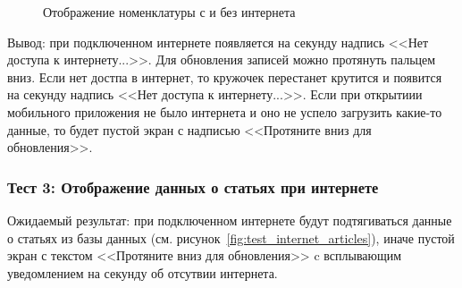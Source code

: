 \begin{figure}[!htb]
    \caption{Отображение номенклатуры с и без интернета}
    \label{fig:test_internet_items}
\end{figure}

Вывод: при подключенном интернете появляется на секунду надпись <<Нет доступа к интернету...>>.
Для обновления записей можно протянуть пальцем вниз. Если нет достпа в интернет,
то кружочек перестанет крутится и появится на секунду надпись <<Нет доступа к интернету...>>.
Если при открытиии мобильного приложения не было интернета и оно не успело загрузить какие-то данные, то будет пустой экран с надписью
<<Протяните вниз для обновления>>.

\subsubsection*{Тест 3: Отображение данных о статьях при интернете}

Ожидаемый результат: при подключенном интернете будут подтягиваться данные о статьях из базы данных (см. рисунок~\ref{fig:test_internet_articles}),
иначе пустой экран с текстом <<Протяните вниз для обновления>>
c всплывающим уведомлением на секунду об отсутвии интернета.

